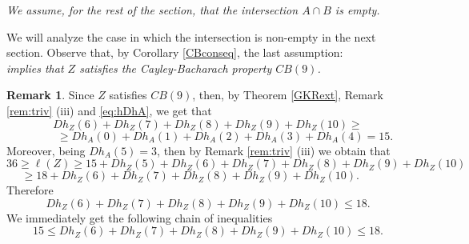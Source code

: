 \documentclass{amsart}
\theoremstyle{definition}
\newtheorem{rem0}[thm0]{Remark}
\begin{document}
{\it We assume, for the rest of the section, that the intersection $A\cap B$ is empty.}
\medskip

We will analyze the case in which the intersection is non-empty in the next section. 
Observe that, by Corollary \ref{CBconseq}, the last assumption:\\
 {\it implies that $Z$ satisfies the Cayley-Bacharach property $CB(9)$.}


\begin{rem0}
Since $ Z $ satisfies $ CB(9) $, then, by Theorem \ref{GKRext}, Remark \ref{rem:triv} (iii) and \eqref{eq:hDhA}, we get that
$$ Dh_{Z}(6) + Dh_{Z}(7) + Dh_{Z}(8) + Dh_{Z}(9) + Dh_{Z}(10) \geq $$
$$ \quad\quad\quad \geq  Dh_{A}(0) + Dh_{A}(1) + Dh_{A}(2) + Dh_{A}(3) + Dh_{A}(4) = 15. $$
Moreover, being $ Dh_{A}(5) = 3 $, then by  Remark \ref{rem:triv} (iii) we obtain that
\begin{equation}\label{eq:lbound}
36 \geq \ell(Z) \geq 15+ Dh_{Z}(5) + Dh_{Z}(6) + Dh_{Z}(7) + Dh_{Z}(8) + Dh_{Z}(9) + Dh_{Z}(10)  
\end{equation}
$$ \geq 18+ Dh_{Z}(6) + Dh_{Z}(7) + Dh_{Z}(8) + Dh_{Z}(9) + Dh_{Z}(10). \quad\quad\quad\, $$
Therefore 
\begin{equation}\label{eq:upbound}
Dh_{Z}(6) + Dh_{Z}(7) + Dh_{Z}(8) + Dh_{Z}(9) + Dh_{Z}(10) \leq 18. 
\end{equation}
We immediately get the following chain of inequalities
\begin{equation}\label{eq:chain}
15 \leq Dh_{Z}(6) + Dh_{Z}(7) + Dh_{Z}(8) + Dh_{Z}(9) + Dh_{Z}(10) \leq 18. 
\end{equation}
\end{rem0}
\end{document}
